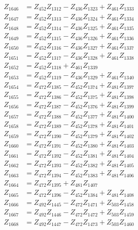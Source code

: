 \begin{multicols}{2}
\begin{align}
Z_{1646} &= Z_{452}Z_{1312} - Z_{436}Z_{1323} + Z_{461}Z_{1333} \nonumber \\
Z_{1647} &= Z_{452}Z_{1313} - Z_{436}Z_{1324} + Z_{461}Z_{1334} \nonumber \\
Z_{1648} &= Z_{452}Z_{1314} - Z_{436}Z_{1325} + Z_{461}Z_{1335} \nonumber \\
Z_{1649} &= Z_{452}Z_{1315} - Z_{436}Z_{1326} + Z_{461}Z_{1336} \nonumber \\
Z_{1650} &= Z_{452}Z_{1316} - Z_{436}Z_{1327} + Z_{461}Z_{1337} \nonumber \\
Z_{1651} &= Z_{452}Z_{1317} - Z_{436}Z_{1328} + Z_{461}Z_{1338} \nonumber \\
Z_{1652} &= Z_{452}Z_{1318} + Z_{461}Z_{1339} \nonumber \\
Z_{1653} &= Z_{452}Z_{1319} - Z_{436}Z_{1329} + Z_{461}Z_{1340} \nonumber \\
Z_{1654} &= Z_{472}Z_{1385} - Z_{452}Z_{1374} + Z_{481}Z_{1397} \nonumber \\
Z_{1655} &= Z_{472}Z_{1386} - Z_{452}Z_{1375} + Z_{481}Z_{1398} \nonumber \\
Z_{1656} &= Z_{472}Z_{1387} - Z_{452}Z_{1376} + Z_{481}Z_{1399} \nonumber \\
Z_{1657} &= Z_{472}Z_{1388} - Z_{452}Z_{1377} + Z_{481}Z_{1400} \nonumber \\
Z_{1658} &= Z_{472}Z_{1389} - Z_{452}Z_{1378} + Z_{481}Z_{1401} \nonumber \\
Z_{1659} &= Z_{472}Z_{1390} - Z_{452}Z_{1379} + Z_{481}Z_{1402} \nonumber \\
Z_{1660} &= Z_{472}Z_{1391} - Z_{452}Z_{1380} + Z_{481}Z_{1403} \nonumber \\
Z_{1661} &= Z_{472}Z_{1392} - Z_{452}Z_{1381} + Z_{481}Z_{1404} \nonumber \\
Z_{1662} &= Z_{472}Z_{1393} - Z_{452}Z_{1382} + Z_{481}Z_{1405} \nonumber \\
Z_{1663} &= Z_{472}Z_{1394} - Z_{452}Z_{1383} + Z_{481}Z_{1406} \nonumber \\
Z_{1664} &= Z_{472}Z_{1395} + Z_{481}Z_{1407} \nonumber \\
Z_{1665} &= Z_{472}Z_{1396} - Z_{452}Z_{1384} + Z_{481}Z_{1408} \nonumber \\
Z_{1666} &= Z_{492}Z_{1445} - Z_{472}Z_{1471} + Z_{503}Z_{1458} \nonumber \\
Z_{1667} &= Z_{492}Z_{1446} - Z_{472}Z_{1472} + Z_{503}Z_{1459} \nonumber \\
Z_{1668} &= Z_{492}Z_{1447} - Z_{472}Z_{1473} + Z_{503}Z_{1460} \nonumber \\

\end{align}
\end{multicols}
